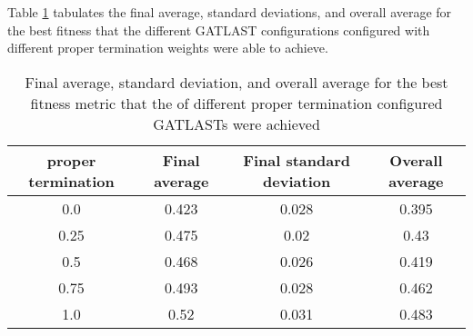 Table \ref{tab:HP:GA:Livelyness:best fitness} tabulates the final average, standard deviations, and overall average for the best fitness that the different GATLAST configurations configured with different proper termination weights were able to achieve.
\begin{table}[tbh!]
\centering
\begin{adjustbox}{trim=0cm 0cm 0cm 0cm, clip=true}
\begin{tabular}{|c|c|c|c|}
\hline
proper termination & Final average & Final standard deviation & Overall average\\
\hline
0.0 & 0.423 & 0.028 & 0.395\\\hline
0.25 & 0.475 & 0.02 & 0.43\\\hline
0.5 & 0.468 & 0.026 & 0.419\\\hline
0.75 & 0.493 & 0.028 & 0.462\\\hline
1.0 & 0.52 & 0.031 & 0.483\\\hline
\end{tabular}
\end{adjustbox}
\caption{Final average, standard deviation, and overall average for the best fitness metric that the of different proper termination configured GATLASTs were achieved}
\label{tab:HP:GA:Livelyness:best fitness}
\end{table}
